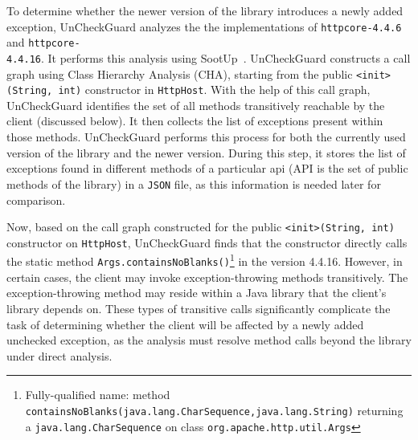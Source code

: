 To determine whether the newer version of the library introduces a newly added exception, UnCheckGuard analyzes the the implementations of \texttt{httpcore-4.4.6} and \texttt{httpcore-\\4.4.16}. It performs this analysis using SootUp~\cite{Karakaya24:_SootUp}. UnCheckGuard constructs a call graph using Class Hierarchy Analysis (CHA), starting from the public \texttt{<init>(String, int)} constructor in \texttt{HttpHost}. With the help of this call graph, UnCheckGuard identifies the set of all methods transitively reachable by the client (discussed below). It then collects the list of exceptions present within those methods. UnCheckGuard performs this process for both the currently used version of the library and the newer version. During this step, it stores the list of exceptions found in different methods of a particular \gls{api} (API is the set of public methods of the library) in a \texttt{JSON} file, as this information is needed later for comparison.

Now, based on the call graph constructed for the public \texttt{<init>(String, int)} constructor on \texttt{HttpHost}, UnCheckGuard finds that the constructor directly calls the static method \texttt{Args.containsNoBlanks()}\footnote{Fully-qualified name: method \texttt{containsNoBlanks(java.lang.CharSequence,java.lang.String)} returning a \texttt{java.lang.CharSequence} on class \texttt{org.apache.http.util.Args} } in the version 4.4.16. However, in certain cases, the client may invoke exception-throwing methods transitively. The exception-throwing method may reside within a Java library that the client's library depends on. These types of transitive calls significantly complicate the task of determining whether the client will be affected by a newly added unchecked exception, as the analysis must resolve method calls beyond the library under direct analysis.

